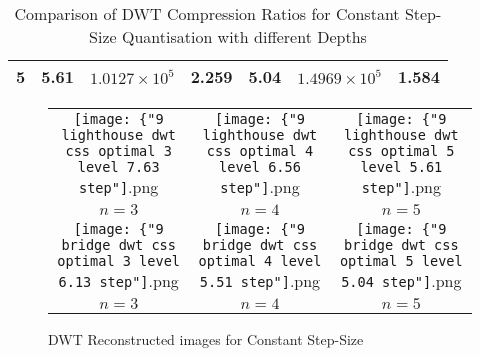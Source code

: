 \documentclass{article}					%
\begin{document}
\begin{appendices}
\begin{table}[h!]
\begin{centering}
\begin{tabular}{l|l|l|l|l|l|l|}
\multicolumn{1}{|l|}{5}                                                              & 5.61                                                                 & $1.0127\times 10^5$     & 2.259                                                                & 5.04                                                                 & $1.4969\times 10^5$     & 1.584                                                                \\ \hline
\end{tabular}
\caption{Comparison of DWT Compression Ratios for Constant Step-Size Quantisation with different Depths}
\end{centering}
\end{table}

\begin{figure}[h!]
\begin{centering}
\begin{tabular}{c c c}
  \texttt{[image: \{"9 lighthouse dwt css optimal 3 level 7.63 step"]}.png} & \texttt{[image: \{"9 lighthouse dwt css optimal 4 level 6.56 step"]}.png} & \texttt{[image: \{"9 lighthouse dwt css optimal 5 level 5.61 step"]}.png} \\
  $n=3$ & $n=4$ & $n=5$\\
  \texttt{[image: \{"9 bridge dwt css optimal 3 level 6.13 step"]}.png} & \texttt{[image: \{"9 bridge dwt css optimal 4 level 5.51 step"]}.png} & \texttt{[image: \{"9 bridge dwt css optimal 5 level 5.04 step"]}.png} \\
  $n=3$ & $n=4$ & $n=5$\\
\end{tabular}
\caption{DWT Reconstructed images for Constant Step-Size}
\end{centering}
\end{figure}


\end{appendices}
\end{document}
